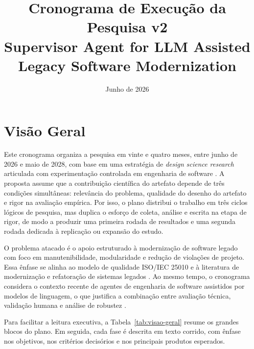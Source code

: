 \documentclass[12pt,a4paper]{article}
\title{Cronograma de Execução da Pesquisa v2\\
\large Supervisor Agent for LLM Assisted Legacy Software Modernization}
\author{}
\date{Junho de 2026}
\begin{document}
\maketitle

\section{Visão Geral}

Este cronograma organiza a pesquisa em vinte e quatro meses, entre junho de 2026 e maio de 2028, com base em uma estratégia de \textit{design science research} articulada com experimentação controlada em engenharia de software \cite{hevner2004, wohlin2012, basili1986}. A proposta assume que a contribuição científica do artefato depende de três condições simultâneas: relevância do problema, qualidade do desenho do artefato e rigor na avaliação empírica. Por isso, o plano distribui o trabalho em três ciclos lógicos de pesquisa, mas duplica o esforço de coleta, análise e escrita na etapa de rigor, de modo a produzir uma primeira rodada de resultados e uma segunda rodada dedicada à replicação ou expansão do estudo.

O problema atacado é o apoio estruturado à modernização de software legado com foco em manutenibilidade, modularidade e redução de violações de projeto. Essa ênfase se alinha ao modelo de qualidade ISO/IEC 25010 e à literatura de modernização e refatoração de sistemas legados \cite{iso25010, seacord2003, feathers2004, fowler1999, martin2003}. Ao mesmo tempo, o cronograma considera o contexto recente de agentes de engenharia de software assistidos por modelos de linguagem, o que justifica a combinação entre avaliação técnica, validação humana e análise de robustez \cite{yang2024}.

Para facilitar a leitura executiva, a Tabela~\ref{tab:visao-geral} resume os grandes blocos do plano. Em seguida, cada fase é descrita em texto corrido, com ênfase nos objetivos, nos critérios decisórios e nos principais produtos esperados.
\end{document}
